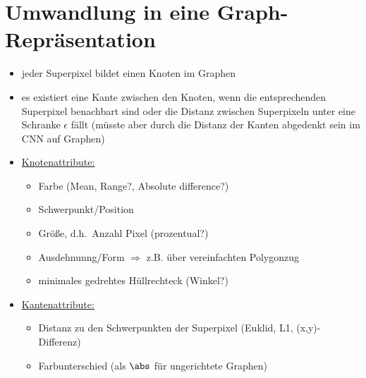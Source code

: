 \section{Umwandlung in eine Graph-Repräsentation}

\begin{itemize}
  \item jeder Superpixel bildet einen Knoten im Graphen
  \item es existiert eine Kante zwischen den Knoten, wenn die entsprechenden Superpixel benachbart sind oder die Distanz zwischen Superpixeln unter eine Schranke $\epsilon$ fällt (müsste aber durch die Distanz der Kanten abgedenkt sein im CNN auf Graphen)
  \item \underline{Knotenattribute:}
  \begin{itemize}
    \item Farbe (Mean, Range?, Absolute difference?)
    \item Schwerpunkt/Position
    \item Größe, d.h.\ Anzahl Pixel (prozentual?)
    \item Ausdehnunng/Form $\Rightarrow$ z.B. über vereinfachten Polygonzug
    \item minimales gedrehtes Hüllrechteck (Winkel?)
  \end{itemize}
  \item \underline{Kantenattribute:}
  \begin{itemize}
    \item Distanz zu den Schwerpunkten der Superpixel (Euklid, L1, (x,y)-Differenz)
    \item Farbunterschied (als $\abs$ für ungerichtete Graphen)
  \end{itemize}
\end{itemize}
